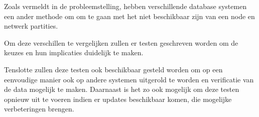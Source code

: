\documentclass{book}
\begin{document}
Zoals vermeldt in de probleemstelling, hebben verschillende database systemen een ander methode om om te gaan met het niet beschikbaar zijn van een node en netwerk partities. 

Om deze verschillen te vergelijken zullen er testen geschreven worden om de keuzes en hun implicaties duidelijk te maken. 

Tenslotte zullen deze testen ook beschikbaar gesteld worden om op een eenvoudige manier ook op andere systemen uitgerold te worden en verificatie van de data mogelijk te maken. Daarnaast is het zo ook mogelijk om deze testen opnieuw uit te voeren indien er updates beschikbaar komen, die mogelijke verbeteringen brengen. 

\printglossary

\printbibliography
\end{document}
